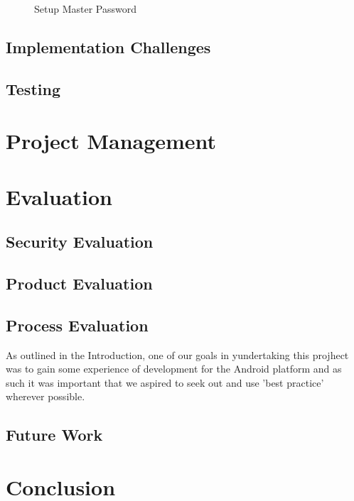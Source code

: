 \begin{figure}[h!]
    \caption{Setup Master Password }
    \label{fig:alert}
\end{figure}
\section{Implementation Challenges}
\section{Testing}

\chapter{Project Management}
\chapter{Evaluation}
\section{Security Evaluation}
\section{Product Evaluation}
\section{Process Evaluation}
As outlined in the Introduction, one of our goals in yundertaking this projhect was to gain some experience of development for the Android platform and as such it was important that we aspired to seek out and use 'best practice' wherever possible.  
\section{Future Work}
\chapter{Conclusion}


